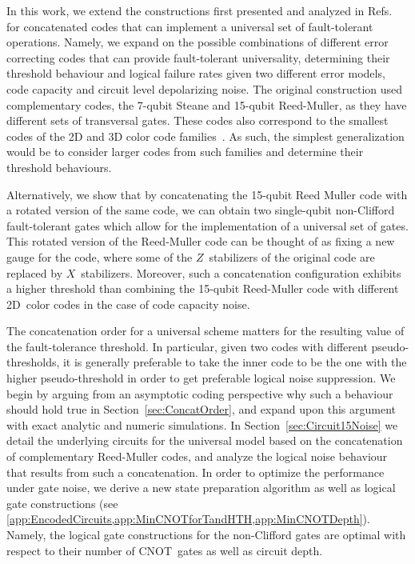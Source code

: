 \documentclass[pra,longbibliography,twocolumn,showpacs,nofootinbib,superscriptaddress,notitlepage]{revtex4-1}
\begin{document}
In this work, we extend the constructions first presented and analyzed in Refs.~\cite{JL14, CJL16} for concatenated codes that can implement a universal set of fault-tolerant operations. Namely, we expand on the possible combinations of different error correcting codes that can provide fault-tolerant universality, determining their threshold behaviour and logical failure rates given two different error models, code capacity and circuit level depolarizing noise. The original construction used complementary codes, the 7-qubit Steane and 15-qubit Reed-Muller, as they have different sets of transversal gates. These codes also correspond to the smallest codes of the 2D and 3D color code families~\cite{BM07, BM07c}. As such, the simplest generalization would be to consider larger codes from such families and determine their threshold behaviours. 

Alternatively, we show that by concatenating the 15-qubit Reed Muller code with a rotated version of the same code, we can obtain two single-qubit non-Clifford fault-tolerant gates which allow for the implementation of a universal set of gates. This rotated version of the Reed-Muller code can be thought of as fixing a new gauge for the code, where some of the $Z$~stabilizers of the original code are replaced by $X$~stabilizers. Moreover, such a concatenation configuration exhibits a higher threshold than combining the 15-qubit Reed-Muller code with different 2D~color codes in the case of code capacity noise.

The concatenation order for a universal scheme matters for the resulting value of the fault-tolerance threshold. In particular, given two codes with different pseudo-thresholds, it is generally preferable to take the inner code to be the one with the higher pseudo-threshold in order to get preferable logical noise suppression. We begin by arguing from an asymptotic coding perspective why such a behaviour should hold true in Section~\ref{sec:ConcatOrder}, and expand upon this argument with exact analytic and numeric simulations. In Section~\ref{sec:Circuit15Noise} we detail the underlying circuits for the universal model based on the concatenation of complementary Reed-Muller codes, and analyze the logical noise behaviour that results from such a concatenation. In order to optimize the performance under gate noise, we derive a new state preparation algorithm as well as logical gate constructions (see \cref{app:EncodedCircuits,app:MinCNOTforTandHTH,app:MinCNOTDepth}). Namely, the logical gate constructions for the non-Clifford gates are optimal with respect to their number of CNOT~gates as well as circuit depth.
\end{document}
